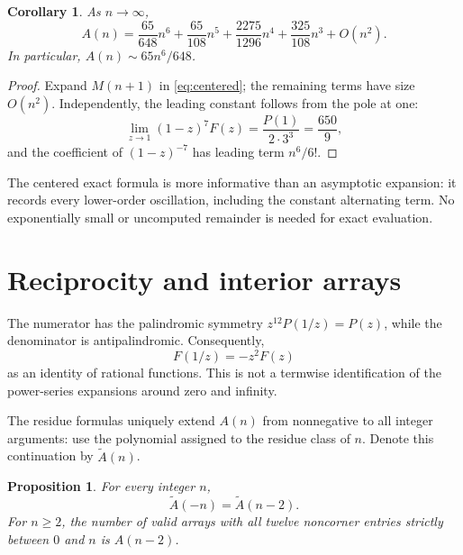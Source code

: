 \documentclass[11pt]{article}
\numberwithin{equation}{section}
\newtheorem{proposition}[theorem]{Proposition}
\newtheorem{corollary}[theorem]{Corollary}
\theoremstyle{definition}
\begin{document}
\begin{corollary}\label{cor:growth}
As $n\to\infty$,
\begin{equation}\label{eq:asymptotic}
 A(n)=\frac{65}{648}n^6+\frac{65}{108}n^5
     +\frac{2275}{1296}n^4+\frac{325}{108}n^3+O(n^2).
\end{equation}
In particular, $A(n)\sim65n^6/648$.
\end{corollary}

\begin{proof}
Expand $M(n+1)$ in \eqref{eq:centered}; the remaining terms have size
$O(n^2)$. Independently, the leading constant follows from the pole at one:
\[
 \lim_{z\to1}(1-z)^7F(z)=\frac{P(1)}{2\cdot3^3}
 =\frac{650}{9},
\]
and the coefficient of $(1-z)^{-7}$ has leading term $n^6/6!$.
\end{proof}

The centered exact formula is more informative than an asymptotic expansion:
it records every lower-order oscillation, including the constant alternating
term. No exponentially small or uncomputed remainder is needed for exact
evaluation.

\section{Reciprocity and interior arrays}
\label{sec:reciprocity}

The numerator has the palindromic symmetry
$z^{12}P(1/z)=P(z)$, while the denominator is antipalindromic. Consequently,
\begin{equation}\label{eq:rationalreciprocity}
 F(1/z)=-z^2F(z)
\end{equation}
as an identity of rational functions. This is not a termwise identification
of the power-series expansions around zero and infinity.

The residue formulas uniquely extend $A(n)$ from nonnegative to all integer
arguments: use the polynomial assigned to the residue class of $n$. Denote
this continuation by $\widetilde A(n)$.

\begin{proposition}\label{prop:reciprocity}
For every integer $n$,
\begin{equation}\label{eq:quasireciprocity}
 \widetilde A(-n)=\widetilde A(n-2).
\end{equation}
For $n\geq2$, the number of valid arrays with all twelve noncorner entries
strictly between $0$ and $n$ is $A(n-2)$.
\end{proposition}
\end{document}
